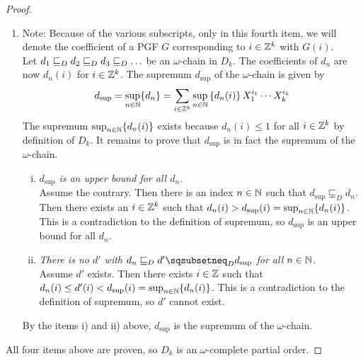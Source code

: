 \begin{lemma}[continues=lem:ext:cpos]
\begin{proof}
\begin{enumerate}
			\item Note: Because of the  various subscripts, only in this fourth item, we will denote the coefficient of a PGF $G$ corresponding to $i \in \mathbb{Z}^k$ with $G(i)$. \\
			Let $d_1 \sqsubseteq_{D} d_2 \sqsubseteq_{D} d_3 \sqsubseteq_{D} \ldots$ be an $\omega$-chain in $D_k$.
			The coefficients of $d_n$ are now $d_n(i)$ for $i \in \mathbb{Z}^k$.
			The supremum $d_{\sup}$ of the $\omega$-chain is given by
			\[ d_{\sup}
				= \sup_{n \in \mathbb{N}} \{d_n\}
				= \sum_{i \in \mathbb{Z}^k} \sup_{n \in \mathbb{N}}
				\left\{ d_n(i) \right\} X_1^{i_1} \cdots X_k^{i_k} \]
			The supremum $\sup_{n \in \mathbb{N}} \{ d_n(i) \}$ exists because $d_n(i) \leq 1$ for all $i \in \mathbb{Z}^k$ by definition of $D_k$.
			It remains to prove that $d_{\sup}$ is in fact the supremum of the $\omega$-chain.
			\begin{enumerate}[i)]
				\item \textit{$d_{\sup}$ is an upper bound for all $d_n$}. \\
				Assume the contrary.
				Then there is an index $n \in \mathbb{N}$ such that $d_{\sup} \sqsubsetneq_D d_n$.
				Then there exists an $i \in \mathbb{Z}^k$ such that
				$d_n(i) > d_{\sup}(i) = \sup_{n \in \mathbb{N}} \{ d_n(i) \}$.
				This is a contradiction to the definition of supremum, so $d_{\sup}$ is an upper bound for all $d_n$.
				
				\item \textit{There is no $d'$ with $d_n \leqD d' \sqsubsetneq_D d_{\sup}$ for all $n \in \mathbb{N}$}. \\
				Assume $d'$ exists.
				Then there exists $i \in \mathbb{Z}$ such that $d_n(i) \leq d'(i) < d_{\sup}(i) = \sup_{n \in \mathbb{N}} \{ d_n(i) \}$.
				This is a contradiction to the definition of supremum, so $d'$ cannot exist.
			\end{enumerate}
			By the items i) and ii) above, $d_{\sup}$ is the supremum of the $\omega$-chain.
		\end{enumerate}
		All four items above are proven, so $D_k$ is an $\omega$-complete partial order.
	\end{proof}
\end{lemma}

